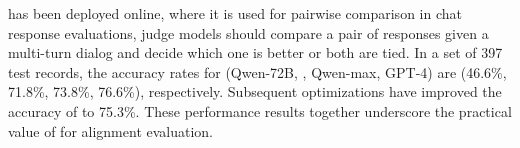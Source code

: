 
\modelname has been deployed online, where it is used for pairwise comparison in chat response evaluations, \ie judge models should compare a pair of responses given a multi-turn dialog and decide which one is better or both are tied. In a set of 397 test records, the accuracy rates for (Qwen-72B, \modelname, Qwen-max, GPT-4) are (46.6\%, 71.8\%, 73.8\%, 76.6\%), respectively. Subsequent optimizations have improved the accuracy of \modelname to 75.3\%. These performance results together underscore the practical value of \modelname for alignment evaluation.


